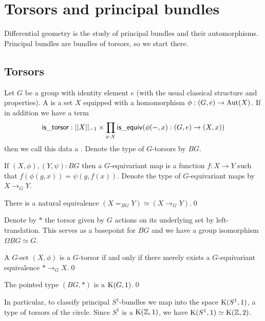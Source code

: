 \section{Torsors and principal bundles}

Differential geometry is the study of principal bundles and their automorphisms. Principal bundles are bundles of torsors, so we start there.

\subsection{Torsors}

\begin{mydef}
Let \( G \) be a group with identity element \( e \) (with the usual classical structure and properties). A  is a set \( X \) equipped with a homomorphism \( \phi:(G,e)\to\operatorname{Aut}(X) \). If in addition we have a term
\[ 
\mathsf{is\_torsor}:||X||_{-1}\times \prod_{x:X}\mathsf{is\_equiv}(\phi(-,x):(G,e)\to (X,x))
\] then we call this data a . Denote the type of \( G \)-torsors by \( BG \).
\end{mydef}

If \( (X,\phi),(Y,\psi):BG \) then a \( G \)-equivariant map is a function \( f:X\to Y \) such that \( f(\phi(g,x))=\psi(g,f(x)) \). Denote the type of \( G \)-equivariant maps by \( X\to_G Y \).

\begin{mylemma}
There is a natural equivalence \( (X=_{BG}Y) \simeq (X\to_G Y) \).\qed
\end{mylemma}

Denote by \( * \) the torsor given by \( G \) actions on its underlying set by left-translation. This serves as a basepoint for \( BG \) and we have a group isomorphism \( \Omega BG\simeq G \).

\begin{mylemma}
A \( G \)-set \( (X,\phi) \) is a \( G \)-torsor if and only if there merely exists a \( G \)-equivariant equivalence \( *\to_G X \).\qed
\end{mylemma}

\begin{mycor}
The pointed type \( (BG,*) \) is a \( \mathrm{K}(G,1) \).\qed
\end{mycor}

In particular, to classify principal \( S^1 \)-bundles we map into the space \( \mathrm{K}(S^1, 1) \), a type of torsors of the circle. Since \( S^1 \) is a \( \mathrm{K}(\mathbb{Z},1) \), we have \( \mathrm{K}(S^1,1)\simeq\mathrm{K}(\mathbb{Z},2) \).

